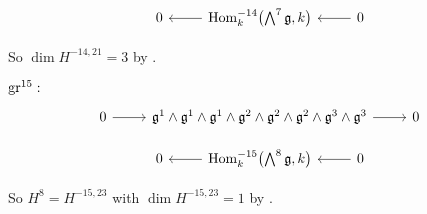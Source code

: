 \[
  \begin{tikzcd}
    0 & \ar[l] \Hom_{k}^{-14}\bigl( \bigwedge^{7}\lie{g},k \bigr) & \ar[l] 0
  \end{tikzcd}
\]

So $\dim H^{-14,21} = 3$ by .

$\operatorname{gr}^{15}:$
\[
  \begin{tikzcd}
    0 \ar[r] & \lie{g}^{1} \wedge \lie{g}^{1} \wedge \lie{g}^{1} \wedge \lie{g}^{2} \wedge \lie{g}^{2} \wedge \lie{g}^{2} \wedge \lie{g}^{3} \wedge \lie{g}^{3}  \ar[r] & 0
  \end{tikzcd}
\]

\[
  \begin{tikzcd}
    0 & \ar[l] \Hom_{k}^{-15}\bigl( \bigwedge^{8}\lie{g},k \bigr) & \ar[l] 0
  \end{tikzcd}
\]

So $H^{8} = H^{-15,23}$ with $\dim H^{-15,23} = 1$ by .

